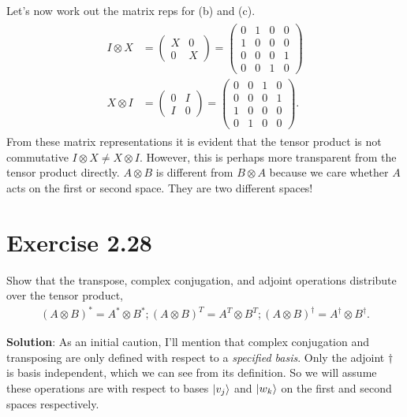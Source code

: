 \documentclass{book}
\begin{document}
    Let's now work out the matrix reps for (b) and (c).
    \begin{align}
    \begin{aligned}
        I\otimes X &= \begin{pmatrix}
            X & 0 \\
            0 & X
        \end{pmatrix} = \begin{pmatrix}
            0 & 1 & 0 & 0 \\
            1 & 0 & 0 & 0 \\
            0 & 0 & 0 & 1 \\
            0 & 0 & 1 & 0
        \end{pmatrix} \\
        X \otimes I &= \begin{pmatrix}
            0 & I \\
            I & 0
        \end{pmatrix} = \begin{pmatrix}
            0 & 0 & 1 & 0 \\
            0 & 0 & 0 & 1 \\
            1 & 0 & 0 & 0 \\
            0 & 1 & 0 & 0
        \end{pmatrix}.
    \end{aligned}
    \end{align}
    From these matrix representations it is evident that the tensor product is not commutative $I \otimes X \neq X \otimes I$. However, this is perhaps more transparent from the tensor product directly. $A\otimes B$ is different from $B \otimes A$ because we care whether $A$ acts on the first or second space. They are two different spaces!
    
\section{Exercise 2.28}
    Show that the transpose, complex conjugation, and adjoint operations distribute over the tensor product,
    \begin{align}
        (A\otimes B)^* = A^* \otimes B^*; (A\otimes B)^T = A^T \otimes B^T; (A\otimes B)^\dagger = A^\dagger \otimes B^\dagger.
    \end{align}
    
    \textbf{Solution}: As an initial caution, I'll mention that complex conjugation and transposing are only defined with respect to a \emph{specified basis}. Only the adjoint $\dagger$ is basis independent, which we can see from its definition. So we will assume these operations are with respect to bases $\ket{v_j}$ and $\ket{w_k}$ on the first and second spaces respectively. 
    
\end{document}
